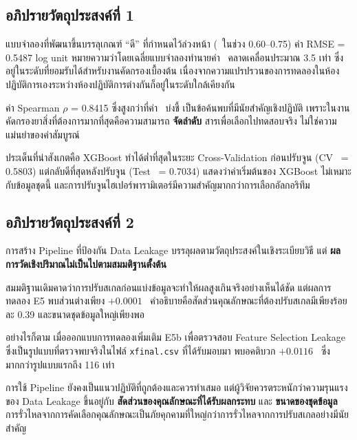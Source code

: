 \subsection{อภิปรายวัตถุประสงค์ที่ 1}

แบบจำลองที่พัฒนาขึ้นบรรลุเกณฑ์ ``ดี'' ที่กำหนดไว้ล่วงหน้า (\Rsq\ ในช่วง 0.60--0.75) ค่า RMSE = 0.5487 log unit หมายความว่าโดยเฉลี่ยแบบจำลองทำนายค่า \ICfifty\ คลาดเคลื่อนประมาณ 3.5 เท่า ซึ่งอยู่ในระดับที่ยอมรับได้สำหรับงานคัดกรองเบื้องต้น เนื่องจากความแปรปรวนของการทดลองในห้องปฏิบัติการเองระหว่างห้องปฏิบัติการต่างกันก็อยู่ในระดับใกล้เคียงกัน

ค่า Spearman $\rho$ = 0.8415 ซึ่งสูงกว่าที่ค่า \Rsq\ บ่งชี้ เป็นข้อค้นพบที่มีนัยสำคัญเชิงปฏิบัติ เพราะในงานคัดกรองยาสิ่งที่ต้องการมากที่สุดคือความสามารถ \textbf{จัดลำดับ} สารเพื่อเลือกไปทดสอบจริง ไม่ใช่ความแม่นยำของค่าสัมบูรณ์

ประเด็นที่น่าสังเกตคือ XGBoost ทำได้ต่ำที่สุดในระยะ Cross-Validation ก่อนปรับจูน (CV \Rsq\ = 0.5803) แต่กลับดีที่สุดหลังปรับจูน (Test \Rsq\ = 0.7034) แสดงว่าค่าเริ่มต้นของ XGBoost ไม่เหมาะกับข้อมูลชุดนี้ และการปรับจูนไฮเปอร์พารามิเตอร์มีความสำคัญมากกว่าการเลือกอัลกอริทึม

\subsection{อภิปรายวัตถุประสงค์ที่ 2}

การสร้าง Pipeline ที่ป้องกัน Data Leakage บรรลุผลตามวัตถุประสงค์ในเชิงระเบียบวิธี แต่ \textbf{ผลการวัดเชิงปริมาณไม่เป็นไปตามสมมติฐานตั้งต้น}

สมมติฐานเดิมคาดว่าการปรับสเกลก่อนแบ่งข้อมูลจะทำให้ผลสูงเกินจริงอย่างเห็นได้ชัด แต่ผลการทดลอง E5 พบส่วนต่างเพียง $+0.0001$ \Rsq\ คำอธิบายคือสัดส่วนคุณลักษณะที่ต้องปรับสเกลมีเพียงร้อยละ 0.39 และขนาดชุดข้อมูลใหญ่เพียงพอ

อย่างไรก็ตาม เมื่อออกแบบการทดลองเพิ่มเติม E5b เพื่อตรวจสอบ Feature Selection Leakage ซึ่งเป็นรูปแบบที่ตรวจพบจริงในไฟล์ \texttt{xfinal.csv} ที่ได้รับมอบมา พบอคติบวก $+0.0116$ \Rsq\ ซึ่งมากกว่ารูปแบบแรกถึง 116 เท่า

\begin{keynote}
การใช้ Pipeline ยังคงเป็นแนวปฏิบัติที่ถูกต้องและควรทำเสมอ แต่ผู้วิจัยควรตระหนักว่าความรุนแรงของ Data Leakage ขึ้นอยู่กับ \textbf{สัดส่วนของคุณลักษณะที่ได้รับผลกระทบ} และ \textbf{ขนาดของชุดข้อมูล} การรั่วไหลจากการคัดเลือกคุณลักษณะเป็นภัยคุกคามที่ใหญ่กว่าการรั่วไหลจากการปรับสเกลอย่างมีนัยสำคัญ
\end{keynote}

